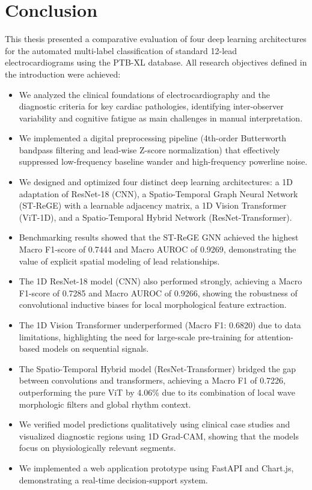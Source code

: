 \documentclass[12pt,a4paper]{report}
\begin{document}
\clearpage

\chapter*{Conclusion}

This thesis presented a comparative evaluation of four deep learning architectures for the automated multi-label classification of standard 12-lead electrocardiograms using the PTB-XL database. All research objectives defined in the introduction were achieved:
\begin{itemize}
    \item We analyzed the clinical foundations of electrocardiography and the diagnostic criteria for key cardiac pathologies, identifying inter-observer variability and cognitive fatigue as main challenges in manual interpretation.
    \item We implemented a digital preprocessing pipeline (4th-order Butterworth bandpass filtering and lead-wise Z-score normalization) that effectively suppressed low-frequency baseline wander and high-frequency powerline noise.
    \item We designed and optimized four distinct deep learning architectures: a 1D adaptation of ResNet-18 (CNN), a Spatio-Temporal Graph Neural Network (ST-ReGE) with a learnable adjacency matrix, a 1D Vision Transformer (ViT-1D), and a Spatio-Temporal Hybrid Network (ResNet-Transformer).
    \item Benchmarking results showed that the ST-ReGE GNN achieved the highest Macro F1-score of 0.7444 and Macro AUROC of 0.9269, demonstrating the value of explicit spatial modeling of lead relationships.
    \item The 1D ResNet-18 model (CNN) also performed strongly, achieving a Macro F1-score of 0.7285 and Macro AUROC of 0.9266, showing the robustness of convolutional inductive biases for local morphological feature extraction.
    \item The 1D Vision Transformer underperformed (Macro F1: 0.6820) due to data limitations, highlighting the need for large-scale pre-training for attention-based models on sequential signals.
    \item The Spatio-Temporal Hybrid model (ResNet-Transformer) bridged the gap between convolutions and transformers, achieving a Macro F1 of 0.7226, outperforming the pure ViT by 4.06\% due to its combination of local wave morphologic filters and global rhythm context.
    \item We verified model predictions qualitatively using clinical case studies and visualized diagnostic regions using 1D Grad-CAM, showing that the models focus on physiologically relevant segments.
    \item We implemented a web application prototype using FastAPI and Chart.js, demonstrating a real-time decision-support system.
\end{itemize}
\end{document}
